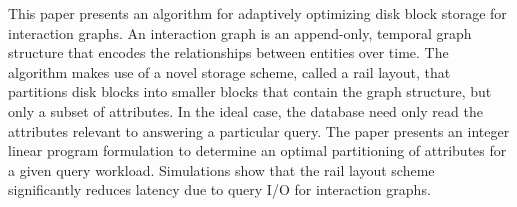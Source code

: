This paper presents an algorithm for adaptively optimizing disk block storage for interaction graphs.  An interaction graph is an append-only, temporal graph structure that encodes the relationships between entities over time. The algorithm makes use of a novel storage scheme, called a rail layout, that partitions disk blocks into smaller blocks that contain the graph structure, but only a subset of attributes. In the ideal case, the database need only read the attributes relevant to answering a particular query. The paper presents an integer linear program formulation to determine an optimal partitioning of attributes for a given query workload. Simulations show that the rail layout scheme significantly reduces latency due to query I/O for interaction graphs. 